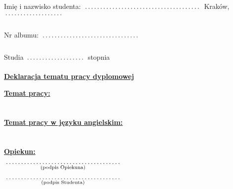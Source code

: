 \documentclass[a4paper,12pt]{article}
\newcommand{\fillField}[2]{
    $\underset{\text{#1}}{\parbox[t]{#2}{\dotfill}}$
}
\begin{document}
\noindent
Imię i nazwisko studenta: \fillField{}{6cm} \hfill Kraków, \fillField{}{3cm}\\\\
Nr albumu:\fillField{}{5cm} \\\\
Studia \fillField{}{3cm} stopnia\\


\vskip 2.0cm

\begin{center}
{\Large \underline{\textbf{Deklaracja tematu pracy dyplomowej}}}
\end{center}

\vskip 0.5cm

\noindent
\underline{\textbf{Temat pracy:}} \dotfill\\

\noindent
\null \dotfill \\\\
\underline{\textbf{Temat pracy w języku angielskim:}} \dotfill\\

\noindent
\null \dotfill \\\\
\underline{\textbf{Opiekun:}} \dotfill \\

\vskip 4.0cm

\null\hfill\fillField{(podpis Opiekuna)}{6cm}%

\vskip 2.0cm

\null\hfill\fillField{(podpis Studenta)}{6cm}%

\vskip 4.0cm
\end{document}
